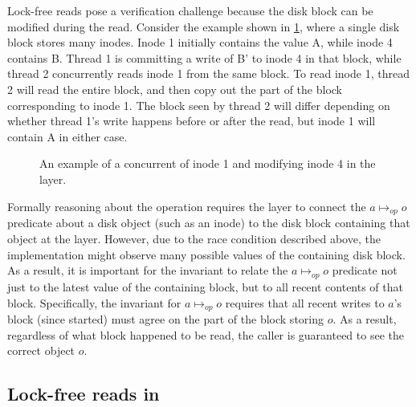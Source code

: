 Lock-free reads pose a verification challenge because the disk
block can be modified during the read.  Consider the example shown
in \cref{fig:txn-concur}, where a single disk block stores many
inodes. Inode 1 initially contains the value A, while inode 4 contains B. Thread 1 is committing a write of B' to inode 4 in that block, while
thread 2 concurrently reads inode 1 from the same block.  To read
inode 1, thread 2 will read the entire block, and then copy out the part
of the block corresponding to inode 1.  The block seen by
thread 2 will differ depending on whether thread 1's write happens
before or after the read, but inode 1 will contain A in either case.


\begin{figure}[ht]
\centering

\vspace{-\baselineskip}
\caption{An example of a concurrent  of inode 1 and 
  modifying inode 4
  in the  layer.}
\label{fig:txn-concur}
\end{figure}

Formally reasoning about the  operation requires the 
layer to connect the $a \mapsto_{\mathit{op}} o$ predicate about a disk object
(such as an inode) to the disk block containing that object at the
 layer.  However, due to the race condition described above,
the  implementation might observe many possible values of the
containing disk block.  As a result, it is important for the 
invariant to relate the $a \mapsto_{\mathit{op}} o$ predicate not just to
the latest value of the containing block, but to all recent contents
of that block.  Specifically, the invariant for $a \mapsto_{\mathit{op}} o$
requires that all recent writes to $a$'s block (since 
started) must agree on the part of the block storing $o$.  As a result,
regardless of what block happened to be read,
the caller is guaranteed to see the correct object $o$.

\subsection[Lock-free reads in WAL]{Lock-free reads in }

